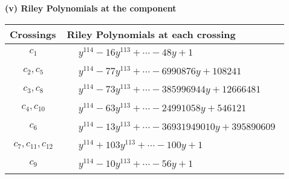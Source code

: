 \documentclass[1p]{elsarticle_modified}
\theoremstyle{definition}
\begin{document}
\flushleft \textbf{(v) Riley Polynomials at the component}\newline \\
\begin{tabular}{m{50pt}|m{274pt}}
Crossings & \hspace{64pt}Riley Polynomials at each crossing \\
\hline $$\begin{aligned}c_{1}\end{aligned}$$&$\begin{aligned}
&y^{114}-16 y^{113}+\cdots-48 y+1
\end{aligned}$\\
\hline $$\begin{aligned}c_{2},c_{5}\end{aligned}$$&$\begin{aligned}
&y^{114}-77 y^{113}+\cdots-6990876 y+108241
\end{aligned}$\\
\hline $$\begin{aligned}c_{3},c_{8}\end{aligned}$$&$\begin{aligned}
&y^{114}-73 y^{113}+\cdots-385996944 y+12666481
\end{aligned}$\\
\hline $$\begin{aligned}c_{4},c_{10}\end{aligned}$$&$\begin{aligned}
&y^{114}-63 y^{113}+\cdots-24991058 y+546121
\end{aligned}$\\
\hline $$\begin{aligned}c_{6}\end{aligned}$$&$\begin{aligned}
&y^{114}-13 y^{113}+\cdots-36931949010 y+395890609
\end{aligned}$\\
\hline $$\begin{aligned}c_{7},c_{11},c_{12}\end{aligned}$$&$\begin{aligned}
&y^{114}+103 y^{113}+\cdots-100 y+1
\end{aligned}$\\
\hline $$\begin{aligned}c_{9}\end{aligned}$$&$\begin{aligned}
&y^{114}-10 y^{113}+\cdots-56 y+1
\end{aligned}$\\
\hline
\end{tabular}\\~\\
\end{document}
